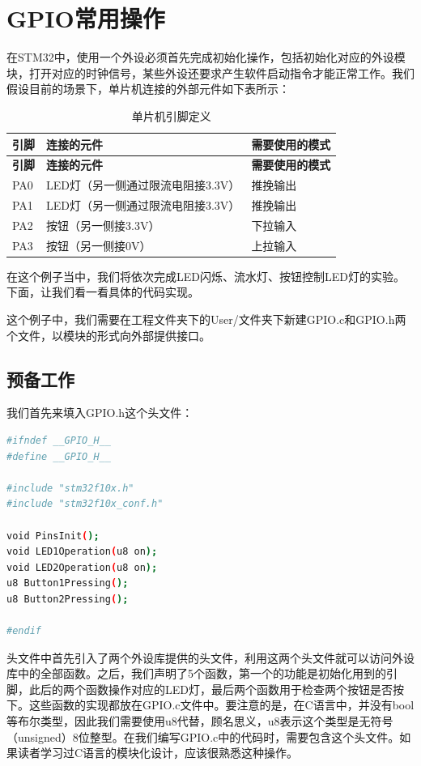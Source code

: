 \section{GPIO常用操作}
在STM32中，使用一个外设必须首先完成初始化操作，包括初始化对应的外设模块，打开对应的时钟信号，某些外设还要求产生软件启动指令才能正常工作。我们假设目前的场景下，单片机连接的外部元件如下表所示：
\begin{center}
	\begin{longtable}[l]{| p{20mm} | p{80mm} | p{40mm} |}
		\caption{单片机引脚定义}\\
		\hline 
		\rowcolor{Gray}
		\textbf{引脚} & \textbf{连接的元件} & \textbf{需要使用的模式} \\
		\hline
		\endfirsthead
		
		\hline 
		\rowcolor{Gray}
		\textbf{引脚} & \textbf{连接的元件} & \textbf{需要使用的模式} \\
		\hline
		\endhead
		
		PA0 & LED灯（另一侧通过限流电阻接3.3V）  & 推挽输出 \\
		PA1 & LED灯（另一侧通过限流电阻接3.3V）  & 推挽输出 \\
		PA2 & 按钮（另一侧接3.3V） & 下拉输入 \\
		PA3 & 按钮（另一侧接0V） & 上拉输入 \\
		
		\hline
	\end{longtable}
\end{center}
\par 
在这个例子当中，我们将依次完成LED闪烁、流水灯、按钮控制LED灯的实验。下面，让我们看一看具体的代码实现。
\par 
这个例子中，我们需要在工程文件夹下的User/文件夹下新建GPIO.c和GPIO.h两个文件，以模块的形式向外部提供接口。

	\subsection{预备工作}
	我们首先来填入GPIO.h这个头文件：
	\par 
	\begin{lstlisting}[language=bash, style=customStyleC, caption=GPIO.h]
#ifndef __GPIO_H__
#define __GPIO_H__

#include "stm32f10x.h" 
#include "stm32f10x_conf.h" 

void PinsInit();
void LED1Operation(u8 on);
void LED2Operation(u8 on);
u8 Button1Pressing();
u8 Button2Pressing();

#endif
	\end{lstlisting}
	\par 
	头文件中首先引入了两个外设库提供的头文件，利用这两个头文件就可以访问外设库中的全部函数。之后，我们声明了5个函数，第一个的功能是初始化用到的引脚，此后的两个函数操作对应的LED灯，最后两个函数用于检查两个按钮是否按下。这些函数的实现都放在GPIO.c文件中。要注意的是，在C语言中，并没有bool等布尔类型，因此我们需要使用u8代替，顾名思义，u8表示这个类型是无符号（unsigned）8位整型。在我们编写GPIO.c中的代码时，需要包含这个头文件。如果读者学习过C语言的模块化设计，应该很熟悉这种操作。
